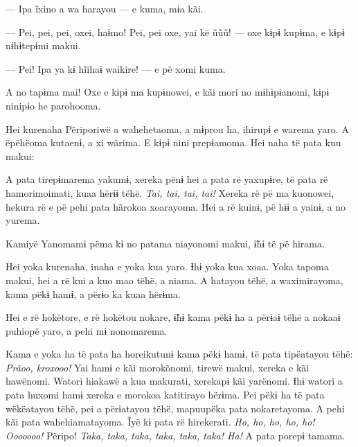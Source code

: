 --- Ipa ĩxino a wa harayou --- e kuma, mɨa kãi. 

--- Pei, pei, pei, oxei, haɨmo! Pei, pei oxe, yai kë ũũũ! --- oxe kɨpɨ
kupɨma, e kɨpɨ nɨhɨtepɨmi makui. 

--- Pei! Ipa ya kɨ hĩihaɨ waikire! --- e pë xomi kuma. 

A no tapɨma mai! Oxe e kɨpɨ ma kupɨnowei, e kãi mori no mɨhɨpɨanomi,
kɨpɨ ninipɨo he parohooma. 

Hei kurenaha Pẽriporiwë a wahehetaoma, a mɨprou ha, ihirupɨ e warema
yaro. A ëpëhëoma kutaenɨ, a xi wãrima. E kɨpɨ nini prepɨamoma. Hei naha
të pata kuu makui:


A pata tirepɨmarema yakumɨ, xereka pënɨ hei a pata rë yaxupɨre, të pata
rë hamorimoimati, kuaa hërɨɨ tëhë. \textit{Tai, tai, tai, tai!} Xereka rë pë ma
kuonowei, hekura rë e pë pehi pata hãrokoa xoarayoma. Hei a rë kuinɨ, pë
hɨɨ a yainɨ, a no yurema. 

Kamiyë Yanomamɨ pëma kɨ no patama niayonomi makui, ɨ̃hɨ të pë hirama. 


Hei yoka kurenaha, inaha e yoka kua yaro. Ɨhɨ yoka kua xoaa. Yoka tapoma
makui, hei a rë kui a kuo mao tëhë, a niama. A hatayou tëhë, a
waximirayoma, kama pëkɨ hamɨ, a përɨo ka kuaa hërɨma. 

Hei e rë hokëtore, e rë hokëtou nokare, ɨ̃hɨ kama pëkɨ ha a përɨaɨ tëhë a
nokaaɨ puhiopë yaro, a pehi mɨ nonomarema. 

Kama e yoka ha të pata ha horeikutunɨ kama pëkɨ hamɨ, të pata tipëatayou
tëhë: \textit{Prãoo, kroxooo!} Yai hamɨ e kãi morokõnomi, tirewë makui, xereka e
kãi hawënomi. Watori hiakawë a kua makurati, xerekapɨ kãi yarënomi. Ɨhɨ
watori a pata huxomi hamɨ xereka e morokoa katitirayo hërɨma. Pei pëkɨ
ha të pata wëkëatayou tëhë, pei a përɨatayou tëhë, mapuupëka pata
nokaretayoma. A pehi kãi pata wahehiamatayoma. Ĩyë kɨ pata rë
hirekerati. \textit{Ho, ho, ho, ho, ho! Ooooooo!} Pẽripo! \textit{Taka, taka, taka, taka,
taka, taka! Ha!} A pata porepɨ tamama. 


